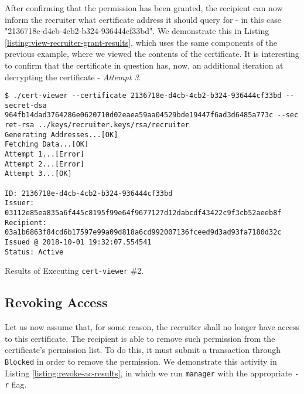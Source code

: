 After confirming that the permission has been granted, the recipient can now inform the recruiter what certificate address it should query for - in this case "2136718e-d4cb-4cb2-b324-936444cf33bd". We demonstrate this in Listing \ref{listing:view-recruiter-grant-results}, which uses the same components of the previous example, where we viewed the contents of the certificate. It is interesting to confirm that the certificate in question has, now, an additional iteration at decrypting the certificate - \emph{Attempt 3}. 

\begin{listing}[ht]
	\begin{verbatim}
$ ./cert-viewer --certificate 2136718e-d4cb-4cb2-b324-936444cf33bd --secret-dsa 964fb14dad3764286e0620710d02eaea59aa04529bde19447f6ad3d6485a773c --sec
ret-rsa ../keys/recruiter.keys/rsa/recruiter
Generating Addresses...[OK]
Fetching Data...[OK]
Attempt 1...[Error]
Attempt 2...[Error]
Attempt 3...[OK]

ID: 2136718e-d4cb-4cb2-b324-936444cf33bd
Issuer: 03112e85ea835a6f445c8195f99e64f9677127d12dabcdf43422c9f3cb52aeeb8f
Recipient: 03a1b6863f84cd6b17597e99a09d818a6cd992007136fceed9d3ad93fa7180d32c
Issued @ 2018-10-01 19:32:07.554541
Status: Active

\end{verbatim}
	\caption{Results of Executing \texttt{cert-viewer} \#2.}
	\label{listing:view-recruiter-grant-results}
\end{listing}

\subsection{Revoking Access}
\label{sec:impl-revoke-ac}

Let us now assume that, for some reason, the recruiter shall no longer have access to this certificate. The recipient is able to remove such permission from the certificate's permission list. To do this, it must submit a transaction through \texttt{Blocked} in order to remove the permission. We demonstrate this activity in Listing \ref{listing:revoke-ac-results}, in which we run \texttt{manager} with the appropriate \texttt{-r} flag.


